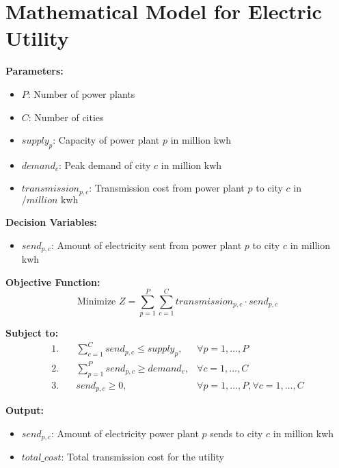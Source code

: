 \documentclass{article}
\begin{document}
\section*{Mathematical Model for Electric Utility}

\textbf{Parameters:}
\begin{itemize}
    \item $P$: Number of power plants
    \item $C$: Number of cities
    \item $supply_{p}$: Capacity of power plant $p$ in million kwh
    \item $demand_{c}$: Peak demand of city $c$ in million kwh
    \item $transmission_{p,c}$: Transmission cost from power plant $p$ to city $c$ in $/million \text{ kwh}$
\end{itemize}

\textbf{Decision Variables:}
\begin{itemize}
    \item $send_{p,c}$: Amount of electricity sent from power plant $p$ to city $c$ in million kwh
\end{itemize}

\textbf{Objective Function:}
\[
\text{Minimize } Z = \sum_{p=1}^{P} \sum_{c=1}^{C} transmission_{p,c} \cdot send_{p,c}
\]

\textbf{Subject to:}
\begin{align*}
1. & \quad \sum_{c=1}^{C} send_{p,c} \leq supply_{p}, & \forall p = 1, \ldots, P \\
2. & \quad \sum_{p=1}^{P} send_{p,c} \geq demand_{c}, & \forall c = 1, \ldots, C \\
3. & \quad send_{p,c} \geq 0, & \forall p = 1, \ldots, P, \forall c = 1, \ldots, C 
\end{align*}

\textbf{Output:}
\begin{itemize}
    \item $send_{p,c}$: Amount of electricity power plant $p$ sends to city $c$ in million kwh
    \item $total\_cost$: Total transmission cost for the utility
\end{itemize}
\end{document}
